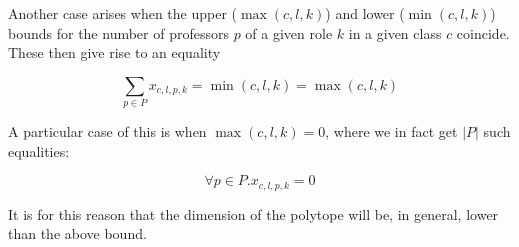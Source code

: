 Another case arises when the upper ($\max(c, l, k)$) and lower ($\min(c, l, k)$) bounds for the number of professors $p$ of a given role $k$ in a given class $c$ coincide. These then give rise to an equality

$$
\sum_{p \in P} x_{c, l, p, k} = \min(c, l, k) = \max(c, l, k)
$$

A particular case of this is when $\max(c, l, k) = 0$, where we in fact get $|P|$ such equalities:

$$
\forall p \in P. x_{c, l, p, k} = 0
$$

It is for this reason that the dimension of the polytope will be, in general, lower than the above bound.
